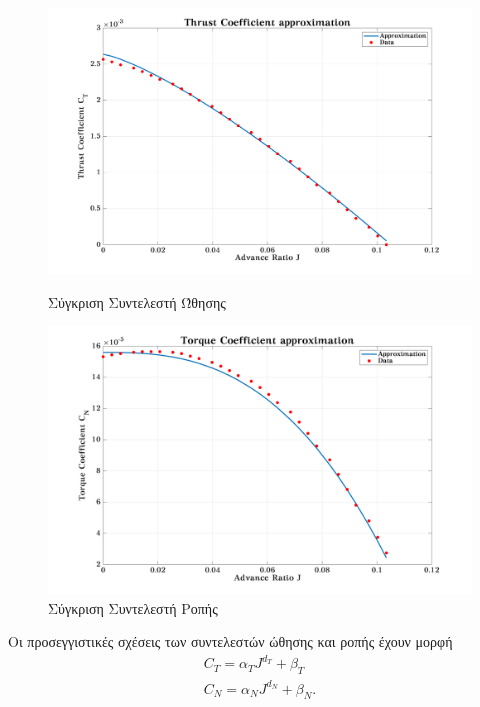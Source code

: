 \begin{figure}[hbt!]
    \begin{minipage}[t]{0.48\linewidth}
        \centering
        \includegraphics[width=\textwidth]{Propeller/fig_CT_J.png}
        \caption{Σύγκριση Συντελεστή Ώθησης}\label{fig_CT}
    \end{minipage}
    \quad
    \begin{minipage}[t]{0.48\linewidth}
        \centering
        \includegraphics[width=\textwidth]{Propeller/fig_CN_J.png}
        \caption{Σύγκριση Συντελεστή Ροπής}\label{fig_CN}
    \end{minipage}
\end{figure}

Οι προσεγγιστικές σχέσεις των συντελεστών ώθησης και ροπής έχουν μορφή
\begin{gather*}
    C_T = \alpha_T J^{d_T} + \beta_T \\
    C_N = \alpha_N J^{d_N} + \beta_N.
\end{gather*}

